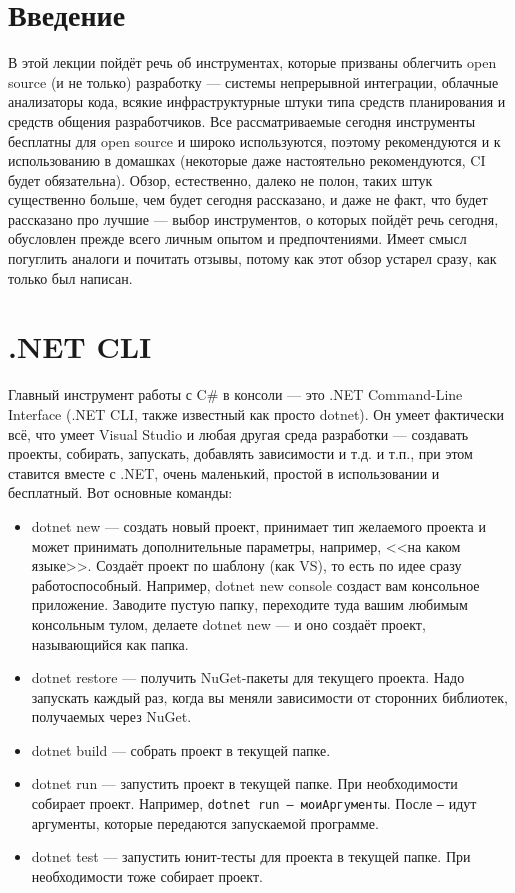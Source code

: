 \documentclass{../../text-style}
\begin{document}
\maketitle
\thispagestyle{empty}

\section{Введение}

В этой лекции пойдёт речь об инструментах, которые призваны облегчить open source (и не только) разработку --- системы непрерывной интеграции, облачные анализаторы кода, всякие инфраструктурные штуки типа средств планирования и средств общения разработчиков. Все рассматриваемые сегодня инструменты бесплатны для open source и широко используются, поэтому рекомендуются и к использованию в домашках (некоторые даже настоятельно рекомендуются, CI будет обязательна). Обзор, естественно, далеко не полон, таких штук существенно больше, чем будет сегодня рассказано, и даже не факт, что будет рассказано про лучшие --- выбор инструментов, о которых пойдёт речь сегодня, обусловлен прежде всего личным опытом и предпочтениями. Имеет смысл погуглить аналоги и почитать отзывы, потому как этот обзор устарел сразу, как только был написан.

\section{.NET CLI}

Главный инструмент работы с C\# в консоли --- это .NET Command-Line Interface (.NET CLI, также известный как просто dotnet). Он умеет фактически всё, что умеет Visual Studio и любая другая среда разработки --- создавать проекты, собирать, запускать, добавлять зависимости и т.д. и т.п., при этом ставится вместе с .NET, очень маленький, простой в использовании и бесплатный. Вот основные команды:

\begin{itemize}
    \item dotnet new --- создать новый проект, принимает тип желаемого проекта и может принимать дополнительные параметры, например, <<на каком языке>>. Создаёт проект по шаблону (как VS), то есть по идее сразу работоспособный. Например, dotnet new console создаст вам консольное приложение. Заводите пустую папку, переходите туда вашим любимым консольным тулом, делаете dotnet new --- и оно создаёт проект, называющийся как папка.
    \item dotnet restore --- получить NuGet-пакеты для текущего проекта. Надо запускать каждый раз, когда вы меняли зависимости от сторонних библиотек, получаемых через NuGet.
    \item dotnet build --- собрать проект в текущей папке.
    \item dotnet run --- запустить проект в текущей папке. При необходимости собирает проект. Например, \texttt{dotnet run -- моиАргументы}. После \texttt{--} идут аргументы, которые передаются запускаемой программе.
    \item dotnet test --- запустить юнит-тесты для проекта в текущей папке. При необходимости тоже собирает проект.
\end{itemize}
\end{document}

